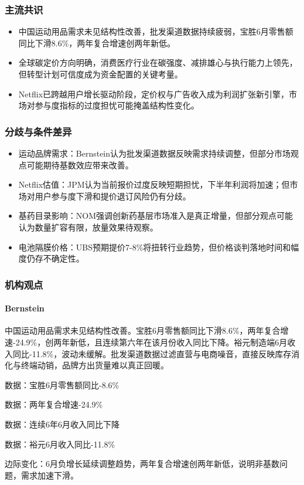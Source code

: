 \documentclass[11pt]{ctexart}
\begin{document}
\subsubsection*{主流共识}
\begin{itemize}
  \item 中国运动用品需求未见结构性改善，批发渠道数据持续疲弱，宝胜6月零售额同比下滑8.6\%，两年复合增速创两年新低。
  \item 全球碳定价方向明确，消费医疗行业在碳强度、减排雄心与执行能力上领先，但转型计划可信度成为资金配置的关键考量。
  \item Netflix已跨越用户增长驱动阶段，定价权与广告收入成为利润扩张新引擎，市场对参与度指标的过度担忧可能掩盖结构性变化。
\end{itemize}
\subsubsection*{分歧与条件差异}
\begin{itemize}
  \item 运动品牌需求：Bernstein认为批发渠道数据反映需求持续调整，但部分市场观点可能期待基数效应带来改善。
  \item Netflix估值：JPM认为当前报价过度反映短期担忧，下半年利润将加速；但市场对用户参与度下滑和提价退订风险仍有分歧。
  \item 基药目录影响：NOM强调创新药基层市场准入是真正增量，但部分观点可能认为数量扩容有限，放量效果待观察。
  \item 电池隔膜价格：UBS预期提价7-8\%将扭转行业趋势，但价格谈判落地时间和幅度仍存不确定性。
\end{itemize}
\subsubsection*{机构观点}
\paragraph{Bernstein} 中国运动用品需求未见结构性改善。宝胜6月零售额同比下滑8.6\%，两年复合增速-24.9\%，创两年新低，且连续第六年在该月份收入同比下降。裕元制造端6月收入同比-11.8\%，波动未缓解。批发渠道数据过滤直营与电商噪音，直接反映库存消化与终端动销，品牌方出货量难以真正回暖。
{\small\color{refgray}数据：宝胜6月零售额同比-8.6\%\par}
{\small\color{refgray}数据：两年复合增速-24.9\%\par}
{\small\color{refgray}数据：连续6年6月收入同比下降\par}
{\small\color{refgray}数据：裕元6月收入同比-11.8\%\par}
{\small\color{refgray}边际变化：6月负增长延续调整趋势，两年复合增速创两年新低，说明非基数问题，需求加速下滑。\par}
\end{document}
